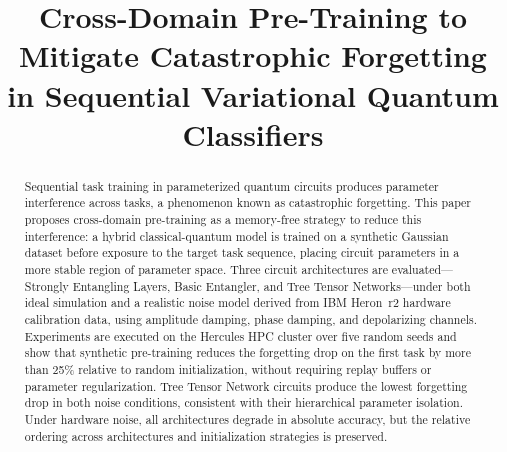 \documentclass[10pt,conference]{IEEEtran}
\begin{document}
\title{Cross-Domain Pre-Training to Mitigate Catastrophic Forgetting
in Sequential Variational Quantum Classifiers}

\author{
\and
{}
\and
{}
\and
{}
\and
{}
}

\begin{abstract}
Sequential task training in parameterized quantum circuits produces
parameter interference across tasks, a phenomenon known as catastrophic
forgetting. This paper proposes cross-domain pre-training as a
memory-free strategy to reduce this interference: a hybrid
classical-quantum model is trained on a synthetic Gaussian dataset
before exposure to the target task sequence, placing circuit parameters
in a more stable region of parameter space. Three circuit architectures
are evaluated---Strongly Entangling Layers, Basic Entangler, and Tree
Tensor Networks---under both ideal simulation and a realistic noise
model derived from IBM Heron~r2 hardware calibration data, using
amplitude damping, phase damping, and depolarizing channels. Experiments
are executed on the Hercules HPC cluster over five random seeds and show
that synthetic pre-training reduces the forgetting drop on the first
task by more than 25\% relative to random initialization, without
requiring replay buffers or parameter regularization. Tree Tensor
Network circuits produce the lowest forgetting drop in both noise
conditions, consistent with their hierarchical parameter isolation.
Under hardware noise, all architectures degrade in absolute accuracy,
but the relative ordering across architectures and initialization
strategies is preserved.
\end{abstract}
\end{document}
